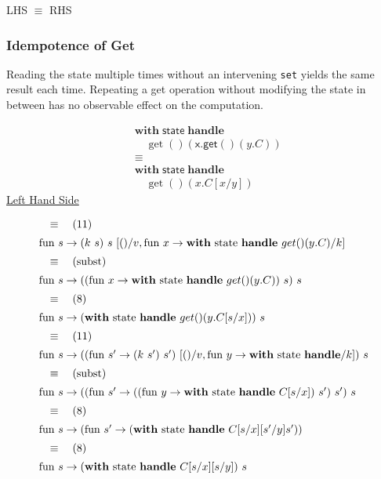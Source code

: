 \documentclass[logo,bsc,singlespacing,parskip]{infthesis}
\begin{document}
LHS $\equiv$ RHS

\subsubsection*{Idempotence of Get}
Reading the state multiple times without an intervening \lstinline{set} yields the same result each time. Repeating a get operation without modifying the state in between has no observable effect on the computation.


\[
\begin{aligned}
    &\mathsf{\textbf{with}} \; \mathsf{state} \; \mathsf{\textbf{handle}} \\
    &\quad \operatorname{get}() \left( \mathsf{x.get}() \left( y.C \right) \right) \\
    &\equiv \\
    &\mathsf{\textbf{with}} \; \mathsf{state} \; \mathsf{\textbf{handle}} \\
    &\quad \operatorname{get}() \left( x.C[x/y] \right)
\end{aligned}
\]
\underline{Left Hand Side}

\[ 
\begin{array}{l}
\quad\equiv\quad (11) \\[5pt]
\text{fun } s \rightarrow (k\ s)\ s\ [()/v, \text{fun } x \rightarrow \text{\textbf{with} state \textbf{handle} } get()(y.C)/k] \\[5pt]
\quad\equiv\quad (\text{subst}) \\[5pt]
\text{fun } s \rightarrow ((\text{fun } x \rightarrow \text{\textbf{with} state \textbf{handle} } get()(y.C))\ s)\ s \\[5pt]
\quad\equiv\quad (8) \\[5pt]
\text{fun } s \rightarrow (\text{\textbf{with} state \textbf{handle} } get()(y.C[s/x]))\ s \\[5pt]
\quad\equiv\quad (11) \\[5pt]
\text{fun } s \rightarrow ((\text{fun } s'\rightarrow (k\ s')\ s')\ [()/v, \text{fun } y\rightarrow \text{\textbf{with} state \textbf{handle}}/k])\ s \\[5pt]
\quad\equiv\quad (\text{subst}) \\[5pt]
\text{fun } s \rightarrow ((\text{fun } s' \rightarrow (( \text{fun } y \rightarrow \text{\textbf{with} state \textbf{handle} } C[s/x])\ s')\ s')\ s \\[5pt]
\quad\equiv\quad (8) \\[5pt]
\text{fun } s \rightarrow (\text{fun } s' \rightarrow (\text{\textbf{with} state \textbf{handle} } C[s/x][s'/y]s')) \\[5pt]
\quad\equiv\quad (8) \\[5pt]
\text{fun } s \rightarrow (\text{\textbf{with} state \textbf{handle} } C[s/x][s/y])\ s
\end{array}
\]
\end{document}
